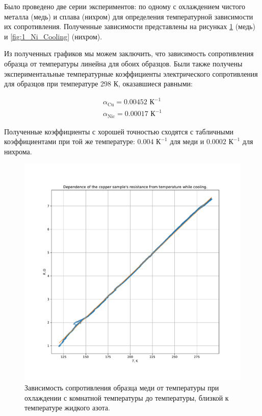 \documentclass[a4paper, 12pt]{article}
\begin{document}
Было проведено две серии экспериментов: по одному с охлаждением чистого металла (медь) и сплава (нихром) для определения температурной зависимости их сопротивления. Полученные зависимости представлены на рисунках \ref{fig:1_Cu_Cooling} (медь) и \ref{fig:1_Ni_Cooling} (нихром).

Из полученных графиков мы можем заключить, что зависимость сопротивления образца от температуры линейна для обоих образцов. Были также получены экспериментальные температурные коэффициенты электрического сопротивления для образцов при температуре 298 К, оказавшиеся равными:

\begin{align*}
	\alpha_{\text{Cu}} = 0.00452 \text{ К}^{-1}\\
	\alpha_{\text{Nic}} = 0.00017 \text{ К}^{-1}
\end{align*}

Полученные коэффициенты с хорошей точностью сходятся с табличными коэффициентами при той же температуре: $0.004 \text{ К}^{-1}$ для меди и $0.0002 \text{ К}^{-1}$ для нихрома.

\begin{figure}[H]
	\centering
	\includegraphics[width=\linewidth]{1_Cu_Cooling}
	\caption{Зависимость сопротивления образца меди от температуры при охлаждении с комнатной температуры до температуры, близкой к температуре жидкого азота.}
	\label{fig:1_Cu_Cooling}
\end{figure}
\end{document}
